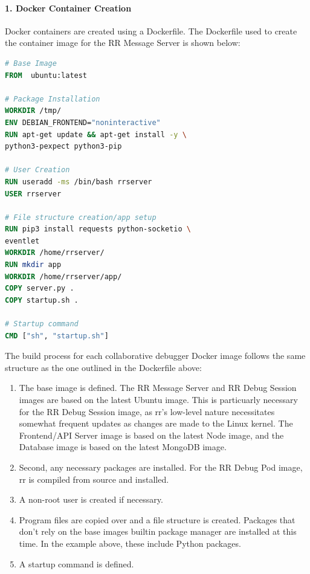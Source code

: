 \documentclass[12pt]{article}
\begin{document}
\paragraph{1. Docker Container Creation}

Docker containers are created using a Dockerfile.  The Dockerfile used
to create the container image for the RR Message
Server is shown below:

\begin{lstlisting}[language=Dockerfile,caption={RR Message Server Dockerfile},captionpos=b]
# Base Image
FROM  ubuntu:latest

# Package Installation
WORKDIR /tmp/
ENV DEBIAN_FRONTEND="noninteractive"
RUN apt-get update && apt-get install -y \
python3-pexpect python3-pip

# User Creation
RUN useradd -ms /bin/bash rrserver
USER rrserver

# File structure creation/app setup
RUN pip3 install requests python-socketio \
eventlet
WORKDIR /home/rrserver/
RUN mkdir app
WORKDIR /home/rrserver/app/
COPY server.py .
COPY startup.sh .

# Startup command
CMD ["sh", "startup.sh"]
\end{lstlisting}

The build process for each collaborative debugger Docker image follows
the same structure as the one outlined in the Dockerfile above:

\begin{enumerate}
\item The base image is defined. The RR Message Server and RR Debug
  Session images are based on the latest Ubuntu image.  This is
  particuarly necessary for the RR Debug Session image, as rr's
  low-level nature necessitates somewhat frequent updates as changes
  are made to the Linux kernel.  The Frontend/API Server image is
  based on the latest Node image, and the Database image is based on
  the latest MongoDB image.
\item Second, any necessary packages are installed.  For the RR Debug
  Pod image, rr is compiled from source and installed.
\item A non-root user is created if necessary.
\item Program files are copied over and a file structure is created.
  Packages that don't rely on the base images builtin package manager
  are installed at this time.  In the example above, these include
  Python packages.
\item A startup command is defined.
\end{enumerate}
\end{document}
